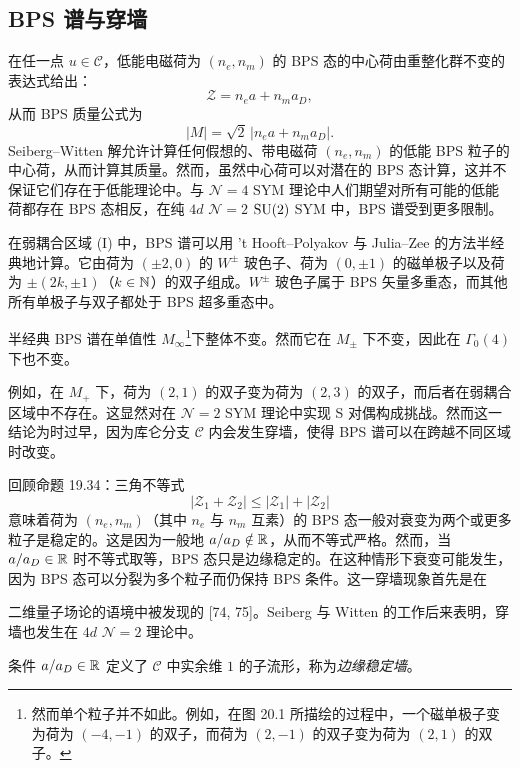 \subsection{BPS 谱与穿墙}

在任一点 $u\in\mathcal{C}$，低能电磁荷为 $(n_e,n_m)$ 的 BPS 态的中心荷由重整化群不变的表达式给出：
\[
\mathcal{Z}=n_ea+n_ma_D,
\]
从而 BPS 质量公式为
\[
|M|=\sqrt2\,|n_ea+n_ma_D|.
\]
Seiberg--Witten 解允许计算任何假想的、带电磁荷 $(n_e,n_m)$ 的低能 BPS 粒子的中心荷，从而计算其质量。然而，虽然中心荷可以对潜在的 BPS 态计算，这并不保证它们存在于低能理论中。与 $\mathcal{N}=4$ SYM 理论中人们期望对所有可能的低能荷都存在 BPS 态相反，在纯 $4d$ $\mathcal{N}=2$ $\operatorname{SU}(2)$ SYM 中，BPS 谱受到更多限制。

在弱耦合区域 (I) 中，BPS 谱可以用 't Hooft--Polyakov 与 Julia--Zee 的方法半经典地计算。它由荷为 $(\pm2,0)$ 的 $W^\pm$ 玻色子、荷为 $(0,\pm1)$ 的磁单极子以及荷为 $\pm(2k,\pm1)$（$k\in\mathbb{N}$）的双子组成。$W^\pm$ 玻色子属于 BPS 矢量多重态，而其他所有单极子与双子都处于 BPS 超多重态中。

\begin{proposition}[20.15]
半经典 BPS 谱在单值性 $M_\infty$\footnote{然而单个粒子并不如此。例如，在图 20.1 所描绘的过程中，一个磁单极子变为荷为 $(-4,-1)$ 的双子，而荷为 $(2,-1)$ 的双子变为荷为 $(2,1)$ 的双子。}下整体不变。然而它在 $M_\pm$ 下不变，因此在 $\Gamma_0(4)$ 下也不变。
\end{proposition}

例如，在 $M_+$ 下，荷为 $(2,1)$ 的双子变为荷为 $(2,3)$ 的双子，而后者在弱耦合区域中不存在。这显然对在 $\mathcal{N}=2$ SYM 理论中实现 S 对偶构成挑战。然而这一结论为时过早，因为库仑分支 $\mathcal{C}$ 内会发生穿墙，使得 BPS 谱可以在跨越不同区域时改变。

回顾命题 19.34：三角不等式
\[
|\mathcal{Z}_1+\mathcal{Z}_2|\le|\mathcal{Z}_1|+|\mathcal{Z}_2|
\]
意味着荷为 $(n_e,n_m)$（其中 $n_e$ 与 $n_m$ 互素）的 BPS 态一般对衰变为两个或更多粒子是稳定的。这是因为一般地 $a/a_D\notin\mathbb{R}$，从而不等式严格。然而，当 $a/a_D\in\mathbb{R}$ 时不等式取等，BPS 态只是边缘稳定的。在这种情形下衰变可能发生，因为 BPS 态可以分裂为多个粒子而仍保持 BPS 条件。这一穿墙现象首先是在

二维量子场论的语境中被发现的 [74, 75]。Seiberg 与 Witten 的工作后来表明，穿墙也发生在 $4d$ $\mathcal{N}=2$ 理论中。

\begin{definition}[20.16]
条件 $a/a_D\in\mathbb{R}$ 定义了 $\mathcal{C}$ 中实余维 $1$ 的子流形，称为\emph{边缘稳定墙}。
\end{definition}


